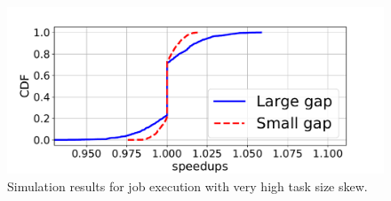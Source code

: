 {\begin{figure}[tp]
\centering
	\includegraphics[width=1.0\linewidth]{figures/numerical_analysis/numerical_analysis_high_skew_speedup.pdf}
	\vspace{-0.1in}
\caption{Simulation results for job execution with very high task size skew.}
\label{fig:numericalAnalysis:highSkew}
\vspace{-0.2in}
\end{figure}


}
